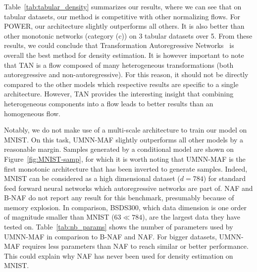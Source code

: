 Table~\ref{tab:tabular_density} summarizes our results, where we can see that on tabular datasets, our method is competitive with other normalizing flows.
For POWER, our architecture slightly outperforms all others.
It is also better than other monotonic networks (category (c)) on 3 tabular datasets over 5.
From these results, we could conclude that Transformation Autoregressive Networks~\citep[TAN, ][]{oliva_transformation_2018} is overall the best method for density estimation.
It is however important to note that TAN is a flow composed of many heterogeneous transformations (both autoregressive and non-autoregressive).
For this reason, it should not be directly compared to the other models which respective results are specific to a single architecture.
However, TAN provides the interesting insight that combining heterogeneous components into a flow leads to better results than an homogeneous flow.

Notably, we do not make use of a multi-scale architecture to train our model on MNIST. On this task,  UMNN-MAF slightly outperforms all other models by a reasonable margin.
Samples generated by a conditional model are shown on Figure~\ref{fig:MNIST-samp}, for which it is worth noting that UMNN-MAF is the first monotonic architecture that has been inverted to generate samples.
Indeed, MNIST can be considered as a high dimensional dataset ($d=784$) for standard feed forward neural networks which autoregressive networks are part of. NAF and B-NAF do not report any result for this benchmark, presumably because of memory explosion.
In comparison, BSDS300, which data dimension is one order of magnitude smaller than MNIST ($63 \ll 784$), are the largest data they have tested on. Table~\ref{tab:nb_params} shows the number of parameters used by UMNN-MAF in comparison to B-NAF and  NAF. For bigger datasets, UMNN-MAF requires less parameters than NAF to reach similar or better performance. This could explain why NAF has never been used for density estimation on MNIST.

